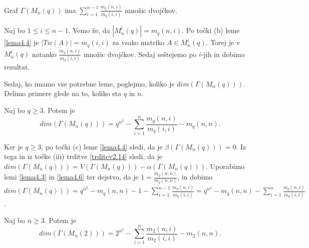 \documentclass[mat1, tisk]{fmfdelo}
\begin{document}
%
\begin{lema}\label{lema4.6}
  Graf $\Gamma(M_n(q))$ ima $\sum\limits_{i=1}^{n-1} \frac{m_q(n,i)}{m_q(i,i)}$ množic dvojčkov.
\end{lema}
\begin{dokaz}
  Naj bo $1 \leq i \leq n-1$. Vemo že, da $|{M}_n^i(q)| = m_q(n,i)$. Po točki (b) 
  leme \ref{lema4.4} je $|Tw(A)| = m_q(i,i)$ za vsako matriko $A \in {M}_n^i(q)$. 
  Torej je v ${M}_n^i(q)$ natanko $\frac{m_q(n,i)}{m_q(i,i)}$ množic dvojčkov. Sedaj 
  seštejemo po $i$-jih in dobimo rezultat.
\end{dokaz}
%
Sedaj, ko imamo vse potrebne leme, poglejmo, koliko je $dim(\Gamma(M_n(q)))$. Delimo 
primere glede na to, koliko sta $q$ in $n$. 
%
\begin{izrek}
  Naj bo $q \geq 3$. Potem je 
  \begin{equation*}
    dim(\Gamma(M_n(q))) = q^{n^2} - \sum\limits_{i=1}^{n}\frac{m_q(n,i)}{m_q(i,i)} - m_q(n,n).
  \end{equation*}
\end{izrek}
\begin{dokaz}
  Ker je $q \geq 3$, po točki (c) leme \ref{lema4.4} sledi, da je $\beta(\Gamma(M_n(q))) = 0$. 
  Iz tega in iz točke (iii) trditve \ref{trditev2.14} sledi, da je 
  $dim(\Gamma(M_n(q))) = V(\Gamma(M_n(q))) - \alpha(\Gamma(M_n(q)))$. Uporabimo lemi \ref{lema4.3} in \ref{lema4.6} ter dejstvo, da je 
  $1 = \frac{m_q(n,n)}{m_q(n,n)}$, in dobimo 
  $dim(\Gamma(M_n(q))) = q^{n^2} - m_q(n,n) - 1 - \sum\limits_{i=1}^{n-1} \frac{m_q(n,i)}{m_q(i,i)} = q^{n^2} - m_q(n,n) - \sum\limits_{i=1}^{n} \frac{m_q(n,i)}{m_q(i,i)} $.
\end{dokaz}
%
\begin{izrek}
  Naj bo $n \geq 3$. Potem je 
  \begin{equation*}
    dim(\Gamma(M_n(2))) = 2^{n^2} - \sum\limits_{i=1}^{n}\frac{m_2(n,i)}{m_2(i,i)} - m_2(n,n).
  \end{equation*}
\end{izrek}
\end{document}
